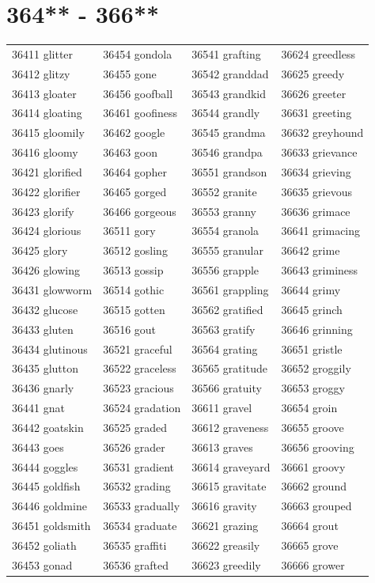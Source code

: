 \documentclass[10pt, oneside]{book}
\begin{document}
\begin{table}
	\centering
	\section*{364** - 366**}
	\begin{tabular}{l l l l}
36411 glitter &36454 gondola &36541 grafting &36624 greedless\\
36412 glitzy &36455 gone &36542 granddad &36625 greedy\\
36413 gloater &36456 goofball &36543 grandkid &36626 greeter\\
36414 gloating &36461 goofiness &36544 grandly &36631 greeting\\
36415 gloomily &36462 google &36545 grandma &36632 greyhound\\
36416 gloomy &36463 goon &36546 grandpa &36633 grievance\\
36421 glorified &36464 gopher &36551 grandson &36634 grieving\\
36422 glorifier &36465 gorged &36552 granite &36635 grievous\\
36423 glorify &36466 gorgeous &36553 granny &36636 grimace\\
36424 glorious &36511 gory &36554 granola &36641 grimacing\\
36425 glory &36512 gosling &36555 granular &36642 grime\\
36426 glowing &36513 gossip &36556 grapple &36643 griminess\\
36431 glowworm &36514 gothic &36561 grappling &36644 grimy\\
36432 glucose &36515 gotten &36562 gratified &36645 grinch\\
36433 gluten &36516 gout &36563 gratify &36646 grinning\\
36434 glutinous &36521 graceful &36564 grating &36651 gristle\\
36435 glutton &36522 graceless &36565 gratitude &36652 groggily\\
36436 gnarly &36523 gracious &36566 gratuity &36653 groggy\\
36441 gnat &36524 gradation &36611 gravel &36654 groin\\
36442 goatskin &36525 graded &36612 graveness &36655 groove\\
36443 goes &36526 grader &36613 graves &36656 grooving\\
36444 goggles &36531 gradient &36614 graveyard &36661 groovy\\
36445 goldfish &36532 grading &36615 gravitate &36662 ground\\
36446 goldmine &36533 gradually &36616 gravity &36663 grouped\\
36451 goldsmith &36534 graduate &36621 grazing &36664 grout\\
36452 goliath &36535 graffiti &36622 greasily &36665 grove\\
36453 gonad &36536 grafted &36623 greedily &36666 grower\\
	\end{tabular}
 \end{table}
\clearpage
\end{document}
